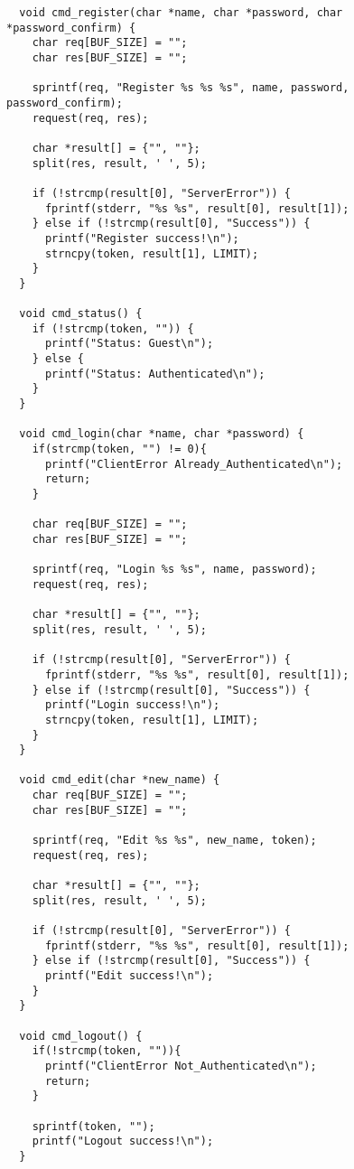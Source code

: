 \documentclass[11pt]{jsarticle}
\begin{document}
\begin{verbatim}
  void cmd_register(char *name, char *password, char *password_confirm) {
    char req[BUF_SIZE] = "";
    char res[BUF_SIZE] = "";
  
    sprintf(req, "Register %s %s %s", name, password, password_confirm);
    request(req, res);
  
    char *result[] = {"", ""};
    split(res, result, ' ', 5);
  
    if (!strcmp(result[0], "ServerError")) {
      fprintf(stderr, "%s %s", result[0], result[1]);
    } else if (!strcmp(result[0], "Success")) {
      printf("Register success!\n");
      strncpy(token, result[1], LIMIT);
    }
  }
  
  void cmd_status() {
    if (!strcmp(token, "")) {
      printf("Status: Guest\n");
    } else {
      printf("Status: Authenticated\n");
    }
  }
  
  void cmd_login(char *name, char *password) {
    if(strcmp(token, "") != 0){
      printf("ClientError Already_Authenticated\n");
      return;
    }
  
    char req[BUF_SIZE] = "";
    char res[BUF_SIZE] = "";
  
    sprintf(req, "Login %s %s", name, password);
    request(req, res);
  
    char *result[] = {"", ""};
    split(res, result, ' ', 5);
  
    if (!strcmp(result[0], "ServerError")) {
      fprintf(stderr, "%s %s", result[0], result[1]);
    } else if (!strcmp(result[0], "Success")) {
      printf("Login success!\n");
      strncpy(token, result[1], LIMIT);
    }
  }
  
  void cmd_edit(char *new_name) {
    char req[BUF_SIZE] = "";
    char res[BUF_SIZE] = "";
  
    sprintf(req, "Edit %s %s", new_name, token);
    request(req, res);
  
    char *result[] = {"", ""};
    split(res, result, ' ', 5);
  
    if (!strcmp(result[0], "ServerError")) {
      fprintf(stderr, "%s %s", result[0], result[1]);
    } else if (!strcmp(result[0], "Success")) {
      printf("Edit success!\n");
    }
  }
  
  void cmd_logout() {
    if(!strcmp(token, "")){
      printf("ClientError Not_Authenticated\n");
      return;
    }
  
    sprintf(token, "");
    printf("Logout success!\n");
  }
\end{verbatim}
\end{document}
